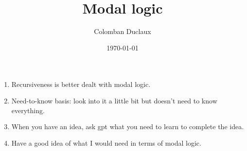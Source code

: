 \documentclass{article}
\title{Modal logic}
\author{Colomban Duclaux}
\date{\today}
\begin{document}
\maketitle

\begin{enumerate}
    \item Recursiveness is better dealt with modal logic.
    \item Need-to-know basis: look into it a little bit but doesn't need to know everything.
    \item When you have an idea, ask gpt what you need to learn to complete the idea.
    \item Have a good idea of what I would need in terms of modal logic.
    
\end{enumerate}
\end{document}
